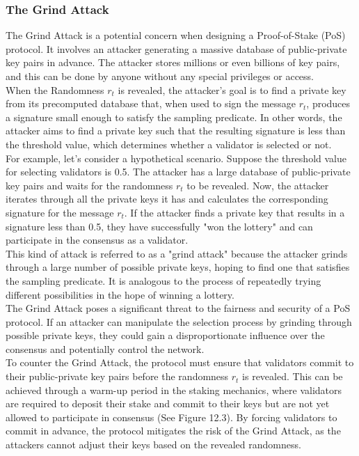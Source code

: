 \subsubsection{The Grind Attack}
The Grind Attack is a potential concern when designing a Proof-of-Stake (PoS) protocol. It involves an attacker generating a massive database of public-private key pairs in advance. The attacker stores millions or even billions of key pairs, and this can be done by anyone without any special privileges or access.\\
When the Randomness $r_t$ is revealed, the attacker's goal is to find a private key from its precomputed database that, when used to sign the message $r_t$, produces a signature small enough to satisfy the sampling predicate. In other words, the attacker aims to find a private key such that the resulting signature is less than the threshold value, which determines whether a validator is selected or not.\\
For example, let's consider a hypothetical scenario. Suppose the threshold value for selecting validators is 0.5. The attacker has a large database of public-private key pairs and waits for the randomness $r_t$ to be revealed. Now, the attacker iterates through all the private keys it has and calculates the corresponding signature for the message $r_t$. If the attacker finds a private key that results in a signature less than 0.5, they have successfully "won the lottery" and can participate in the consensus as a validator.\\
This kind of attack is referred to as a "grind attack" because the attacker grinds through a large number of possible private keys, hoping to find one that satisfies the sampling predicate. It is analogous to the process of repeatedly trying different possibilities in the hope of winning a lottery.\\
The Grind Attack poses a significant threat to the fairness and security of a PoS protocol. If an attacker can manipulate the selection process by grinding through possible private keys, they could gain a disproportionate influence over the consensus and potentially control the network.\\
To counter the Grind Attack, the protocol must ensure that validators commit to their public-private key pairs before the randomness $r_t$ is revealed. This can be achieved through a warm-up period in the staking mechanics, where validators are required to deposit their stake and commit to their keys but are not yet allowed to participate in consensus (See Figure 12.3). By forcing validators to commit in advance, the protocol mitigates the risk of the Grind Attack, as the attackers cannot adjust their keys based on the revealed randomness.
